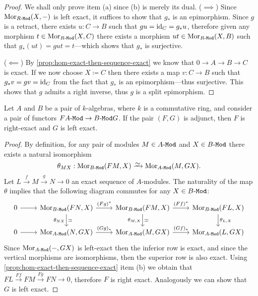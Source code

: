\begin{proof}
    We shall only prove item (a) since (b) is merely its dual. (\(\implies\)) Since
    \(\operatorname{Mor}_{{R\text{-}\texttt{Mod}}}(X, -)\) is left exact, it suffices to show that \(g_{*}\) is an
    epimorphism. Since \(g\) is a retract, there exists \(u: C \to B\) such that
    \(g u = \operatorname{id}_C = g_{*} u\), therefore given any morphism
    \(t \in \operatorname{Mor}_{{R\text{-}\texttt{Mod}}}(X, C)\) there exists a morphism
    \(u t \in \operatorname{Mor}_{{R\text{-}\texttt{Mod}}}(X, B)\) such that \(g_{*}(u t) = g u t = t\)---which shows
    that \(g_{*}\) is surjective.

    (\(\impliedby\)) By \cref{prop:hom-exact-then-sequence-exact} we know that
    \(0 \to A \to B \to C\) is exact. If we now choose \(X \coloneq C\) then there exists a map
    \(v: C \to B\) such that \(g_{*} v = g v = \operatorname{id}_C\) from the fact that \(g_{*}\) is
    an epimorphism---thus surjective. This shows that \(g\) admits a right inverse,
    thus \(g\) is a split epimorphism.
\end{proof}

\begin{theorem}
    \label{thm:mod-cat-adjoint-pair-right-left-exact-functors}
    Let \(A\) and \(B\) be a pair of \(k\)-algebras, where \(k\) is a commutative
    ring, and consider a pair of functors \(F \relax {A\text{-}\texttt{Mod}} \to {B\text{-}\texttt{Mod}} \relax G\). If
    the pair \((F, G)\) is adjunct, then \(F\) is right-exact and \(G\) is left
    exact.
\end{theorem}

\begin{proof}
    By definition, for any pair of modules \(M \in {A\text{-}\texttt{Mod}}\) and \(X \in {B\text{-}\texttt{Mod}}\) there
    exists a natural isomorphism
    \[
        \theta_{M X}: \Mor_{\Mod B}(F M, X) \isoto \Mor_{\Mod A}(M, G X).
    \]
    Let \(L \xrightarrow{f} M \xrightarrow{g} N \to 0\) an exact sequence of
    \(A\)-modules. The naturality of the map \(\theta\) implies that the following
    diagram commutes for any \(X \in {B\text{-}\texttt{Mod}}\):
    \[
        \begin{tikzcd}
            0 \ar[r]
            &\Mor_{\Mod B}(F N, X) \ar[r, "{(F g)^{*}}"]
            \ar[d, "\theta_{N X}"', "\dis"]
            &\Mor_{\Mod B}(F M, X) \ar[r, "{(F f)^{*}}"]
            \ar[d, "\theta_{M, X}"', "\dis"]
            &\Mor_{\Mod B}(F L, X) \ar[d, "\theta_{L, X}"]
            \\
            0 \ar[r]
            &\Mor_{\Mod A}(N, G X) \ar[r, "{(G g)_{*}}"]
            &\Mor_{\Mod A}(M, G X) \ar[r, "{(G f)_{*}}"]
            &\Mor_{\Mod A}(L, G X)
        \end{tikzcd}
    \]
    Since \(\operatorname{Mor}_{{A\text{-}\texttt{Mod}}}(-, G X)\) is left-exact then the inferior row is exact,
    and since the vertical morphisms are isomorphisms, then the superior row is also
    exact. Using \cref{prop:hom-exact-then-sequence-exact} item (b) we obtain that
    \(F L \xrightarrow{F f} F M \xrightarrow{F g} F N \to 0\), therefore \(F\) is
    right exact. Analogously we can show that \(G\) is left exact.
\end{proof}

